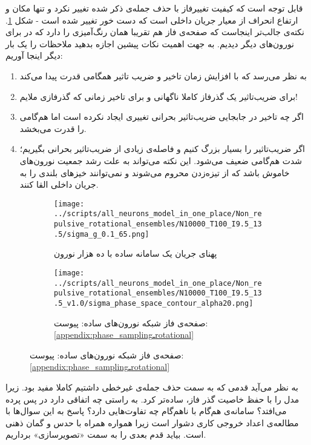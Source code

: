 قابل توجه است که کیفیت تغییرفاز با حذف جمله‌ی ذکر شده تغییر نکرد و تنها مکان و ارتفاع انحراف از معیار جریان داخلی است که دست خور تغییر شده است - شکل \ref{fig:sigma_non_repulsive}. نکته‌ی جالب‌تر اینجاست که صفحه‌ی فاز هم تقریبا همان رنگ‌آمیزی را دارد که در برای نورون‌های دیگر دیدیم. به جهت اهمیت نکات پیشین اجازه بدهید ملاحظات را یک بار دیگر اینجا آوریم:\\

\begin{enumerate}[1.]
	\item 
	به نظر می‌رسد که با افزایش زمان تاخیر و ضریب تاثیر همگامی قدرت پیدا می‌کند
	\item 
	برای ضریب‌تاثیر یک گذرفاز کاملا ناگهانی و برای تاخیر زمانی که گذرفازی ملایم!
	\item 
	اگر چه تاخیر در جابجایی ضریب‌تاثیر بحرانی تغییری ایجاد نکرده است اما هم‌گامی را قدرت می‌بخشد.
	\item
	اگر ضریب‌تاثیر را بسیار بزرگ کنیم و فاصله‌ی زیادی از ضریب‌تاثیر بحرانی بگیریم؛ شدت هم‌گامی ضعیف می‌شود. این نکته می‌تواند به علت رشد جمعیت نورون‌های خاموش باشد که از تیزه‌زدن محروم می‌شوند و نمی‌توانند خیزهای بلندی را به جریان داخلی القا کنند.
\end{enumerate}



\begin{figure}
	\begin{subfigure}{0.5\textwidth}
		\centering
		\texttt{[image: ../scripts/all\_neurons\_model\_in\_one\_place/Non\_repulsive\_rotational\_ensembles/N10000\_T100\_I9.5\_13.5/sigma\_g\_0.1\_65.png]}
		\caption{پهنای جریان یک سامانه ساده با ده هزار نورون}
		\label{fig:sigma_non_repulsive}
	\end{subfigure}
	\hfill
	\begin{subfigure}{0.5\textwidth}
		\texttt{[image: ../scripts/all\_neurons\_model\_in\_one\_place/Non\_repulsive\_rotational\_ensembles/N10000\_T100\_I9.5\_13.5\_v1.0/sigma\_phase\_space\_contour\_alpha20.png]}
		\caption{
			صفحه‌ی فاز شبکه نورون‌های ساده: پیوست:
			\ref{appendix:phase_samplingـrotational}
		}
		\label{fig:if_g_d_phase_space_Non_repulsive}
	\end{subfigure}
\end{figure}

به نظر می‌آید قدمی که به سمت حذف جمله‌ی غیرخطی داشتیم کاملا مفید بود. زیرا مدل را با حفظ خاصیت گذر فاز، ساده‌تر کرد.  به راستی چه اتفاقی دارد در پس پرده می‌افتد؟ سامانه‌ی هم‌گام با ناهم‌گام چه تفاوت‌هایی دارد؟ پاسخ به این سوال‌ها با مطالعه‌ی اعداد خروجی کاری دشوار است زیرا همواره همراه با حدس و گمان ذهنی است. بیاید قدم بعدی را به سمت «تصویرسازی» برداریم.
